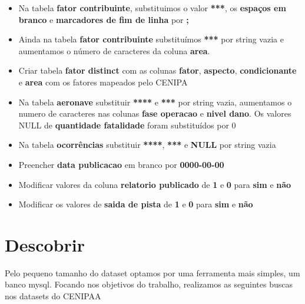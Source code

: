 \documentclass[conference]{IEEEtran}
\begin{document}
\begin{itemize}
 \item Na tabela \textbf{fator contribuinte}, substituimos o valor \textbf{***}, os \textbf{espaços em branco} e \textbf{marcadores de fim de linha} por \textbf{;}
 \item Ainda na tabela \textbf{fator contribuinte} substituímos \textbf{***} por string vazia e aumentamos o número de caracteres da coluna \textbf{area}.
 \item Criar tabela \textbf{fator distinct} com as colunas \textbf{fator}, \textbf{aspecto}, \textbf{condicionante} e \textbf{area} com os fatores mapeados pelo CENIPA
 \item Na tabela \textbf{aeronave} substituir \textbf{****} e \textbf{***} por string vazia, aumentamos o numero de caracteres nas colunas \textbf{fase operacao} e \textbf{nivel dano}. Os valores NULL de \textbf{quantidade fatalidade} foram substituídos por 0 
 \item Na tabela \textbf{ocorrências} substituir \textbf{****}, \textbf{***} e \textbf{NULL} por string vazia
 \item Preencher \textbf{data publicacao} em branco por \textbf{0000-00-00}
 \item Modificar valores da coluna \textbf{relatorio publicado} de \textbf{1} e \textbf{0} para \textbf{sim} e \textbf{não}
 \item Modificar os valores de \textbf{saida de pista} de \textbf{1} e \textbf{0} para \textbf{sim} e \textbf{não}
\end{itemize}

\section{Descobrir}

Pelo pequeno tamanho do dataset optamos por uma ferramenta mais simples, um banco mysql. Focando nos objetivos do trabalho, realizamos as seguintes buscas nos datasets 
do CENIPAA\\
\end{document}
